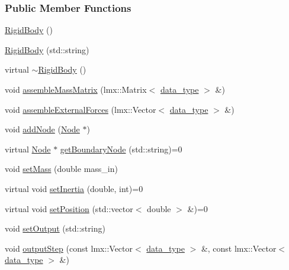 \subsubsection*{Public Member Functions}
\begin{DoxyCompactItemize}
\item 
\hyperlink{classmknix_1_1_rigid_body_a4e30b93577cba2bdf87201621a5b637c}{Rigid\-Body} ()
\item 
\hyperlink{classmknix_1_1_rigid_body_a2b343858ebee91bb44df59d7a19a5f10}{Rigid\-Body} (std\-::string)
\item 
virtual \hyperlink{classmknix_1_1_rigid_body_a61c219dee02f49659bc34528c2d0af49}{$\sim$\-Rigid\-Body} ()
\item 
void \hyperlink{classmknix_1_1_rigid_body_ac20200b40e6e222261bb8257e339d7b4}{assemble\-Mass\-Matrix} (lmx\-::\-Matrix$<$ \hyperlink{namespacemknix_a16be4b246fbf2cceb141e3a179111020}{data\-\_\-type} $>$ \&)
\item 
void \hyperlink{classmknix_1_1_rigid_body_a18c7ffa5b9f2d3df008a92f421404fac}{assemble\-External\-Forces} (lmx\-::\-Vector$<$ \hyperlink{namespacemknix_a16be4b246fbf2cceb141e3a179111020}{data\-\_\-type} $>$ \&)
\item 
void \hyperlink{classmknix_1_1_rigid_body_a88b0dfc0af5002ee8d060df5e520434f}{add\-Node} (\hyperlink{classmknix_1_1_node}{Node} $\ast$)
\item 
virtual \hyperlink{classmknix_1_1_node}{Node} $\ast$ \hyperlink{classmknix_1_1_rigid_body_a1a0f0fa9c789fbb7aa6c3404939d7b36}{get\-Boundary\-Node} (std\-::string)=0
\item 
void \hyperlink{classmknix_1_1_rigid_body_a414c67125617203f207508c35c38180e}{set\-Mass} (double mass\-\_\-in)
\item 
virtual void \hyperlink{classmknix_1_1_rigid_body_a3c41ec0b893b6376614dd5d560d6f011}{set\-Inertia} (double, int)=0
\item 
virtual void \hyperlink{classmknix_1_1_rigid_body_a43249b2d83145ec87c8204da2f6a048c}{set\-Position} (std\-::vector$<$ double $>$ \&)=0
\item 
void \hyperlink{classmknix_1_1_rigid_body_a7d3b331008d65caf46f5575fec6943b5}{set\-Output} (std\-::string)
\item 
void \hyperlink{classmknix_1_1_rigid_body_a721e9f81cfba9a3d425df36f7cf5ef71}{output\-Step} (const lmx\-::\-Vector$<$ \hyperlink{namespacemknix_a16be4b246fbf2cceb141e3a179111020}{data\-\_\-type} $>$ \&, const lmx\-::\-Vector$<$ \hyperlink{namespacemknix_a16be4b246fbf2cceb141e3a179111020}{data\-\_\-type} $>$ \&)

\end{DoxyCompactItemize}
